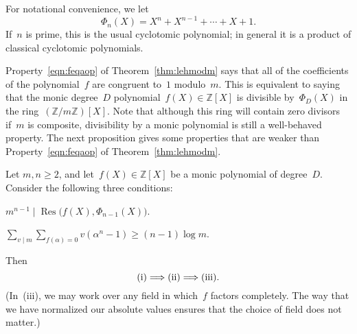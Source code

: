 \begin{definition}
For notational convenience, we let
\[
  {\Phi}_n(X) = X^n+X^{n-1}+\cdots+X+1.
\]
If~$n$ is prime, this is the usual cyclotomic polynomial; in general it
is a product of classical cyclotomic polynomials.
\end{definition}

Property~\eqref{eqn:feqaop} of Theorem~\ref{thm:lehmodm} says that all
of the coefficients of the polynomial~$f$ are congruent to~$1$
modulo~$m$.  This is equivalent to saying that the monic degree~$D$
polynomial~$f(X)\in{\mathbb{Z}}[X]$ is divisible by~${\Phi}_D(X)$ in the
ring~$({\mathbb{Z}}/m{\mathbb{Z}})[X]$. Note that although this ring will contain zero
divisors if~$m$ is composite, divisibility by a monic polynomial is
still a well-behaved property.  The next proposition gives some
properties that are weaker than Property~\eqref{eqn:feqaop} of
Theorem~\ref{thm:lehmodm}.

\begin{proposition}
\label{prop:wkmodm}
Let $m,n\ge2$, and let~$f(X)\in{\mathbb{Z}}[X]$ be a monic polynomial of
degree~$D$.  Consider the following three conditions\textup:
\begin{parts}
{\item[\upshape{(i)}]}
\vspace{1\jot}
{\item[\upshape{(ii)}]}
  $m^{n-1} \mid {\operatorname{Res}}\bigl(f(X),{\Phi}_{n-1}(X)\bigr)$.
\vspace{1\jot}
{\item[\upshape{(iii)}]}
  $\displaystyle \sum_{v\mid m} \sum_{f({\alpha})=0}
    v({\alpha}^{n}-1) \ge (n-1)\log m$.
\end{parts}
Then
\[
  \textup{(i)} \Longrightarrow
  \textup{(ii)} \Longrightarrow
  \textup{(iii)}.
\]
\textup(In~\textup{(iii)}, we may work over any field in which~$f$ factors
completely. The way that we have normalized our absolute values
ensures that the choice of field does not matter.\textup) 
\end{proposition}

